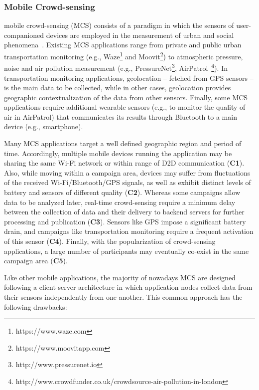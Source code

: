 \subsubsection{Mobile Crowd-sensing}

mobile crowd-sensing (MCS) consists of a paradigm in which the sensors of user-companioned devices are employed in the measurement of urban and social phenomena~\cite{Guo:2015}. Existing MCS applications range from private and public urban transportation monitoring (e.g., Waze\footnote{https://www.waze.com} and Moovit\footnote{https://www.moovitapp.com}) to atmospheric pressure, noise and air pollution measurement (e.g., PressureNet\footnote{http://www.pressurenet.io}, AirPatrol~\footnote{http://www.crowdfunder.co.uk/crowdsource-air-pollution-in-london}). In transportation monitoring applications, geolocation -- fetched from GPS sensors -- is the main data to be collected, while in other cases, geolocation provides geographic contextualization of the data from other sensors. Finally, some MCS applications require additional wearable sensors (e.g., to monitor the quality of air in AirPatrol) that communicates its results through Bluetooth to a main device (e.g., smartphone).

Many MCS applications target a well defined geographic region and period of time. Accordingly, multiple mobile devices running the application may be sharing the same Wi-Fi network or within range of D2D communication (\textbf{C1}). Also, while moving within a campaign area, devices may suffer from fluctuations of the received Wi-Fi/Bluetooth/GPS signals, as well as exhibit distinct levels of battery and sensors of different quality (\textbf{C2}).
Whereas some campaigns allow data to be analyzed later, real-time crowd-sensing require a minimum delay between the collection of data and their delivery to backend servers for further processing and publication (\textbf{C3}). Sensors like GPS impose a significant battery drain, and campaigns like transportation monitoring require a frequent activation of this sensor (\textbf{C4}). Finally, with the popularization of crowd-sensing applications, a large number of participants may eventually co-exist in the same campaign area (\textbf{C5}). 

Like other mobile applications, the majority of nowadays MCS are designed following a client-server architecture in which application nodes collect data from their sensors independently from one another. 
This common approach has the following drawbacks:


